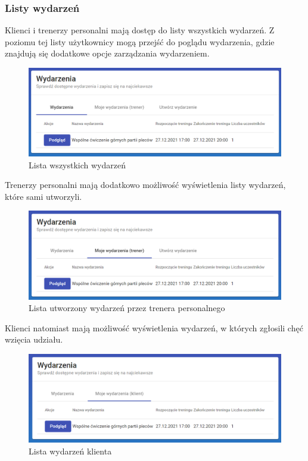 \documentclass[a4paper,twoside,12pt]{book}
\begin{document}
\subsubsection{Listy wydarzeń}
Klienci i trenerzy personalni mają dostęp do listy wszystkich wydarzeń. Z poziomu tej listy użytkownicy mogą przejść do poglądu wydarzenia, gdzie znajdują się dodatkowe opcje zarządzania wydarzeniem.
\begin{figure}[h!]
	\centering
	\includegraphics[width=1\linewidth]{../zrzuty_ekranu/dzialanie/wydarzenia/wszystkie_wydarzenia}
	\caption{Lista wszystkich wydarzeń}
	\label{fig:wszystkiewydarzenia}
\end{figure}
\FloatBarrier
Trenerzy personalni mają dodatkowo możliwość wyświetlenia listy wydarzeń, które sami utworzyli.
\begin{figure}[h!]
	\centering
	\includegraphics[width=1\linewidth]{../zrzuty_ekranu/dzialanie/wydarzenia/trener_lista_wydarzen}
	\caption{Lista utworzony wydarzeń przez trenera personalnego}
	\label{fig:trenerlistawydarzen}
\end{figure}
\FloatBarrier
\newpage
Klienci natomiast mają możliwość wyświetlenia wydarzeń, w których zgłosili chęć wzięcia udziału.
\begin{figure}[h!]
	\centering
	\includegraphics[width=0.9\linewidth]{../zrzuty_ekranu/dzialanie/wydarzenia/klient_lista_wydarzen}
	\caption{Lista wydarzeń klienta}
	\label{fig:klientlistawydarzen}
\end{figure}
\FloatBarrier
\end{document}
